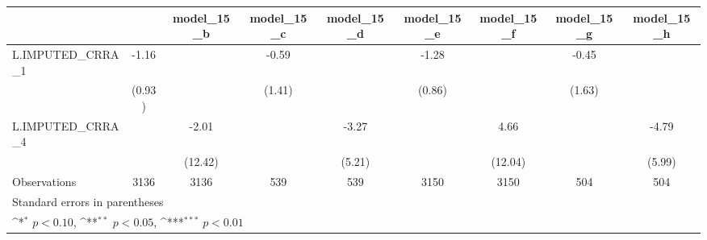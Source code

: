 {
\def\sym#1{\ifmmode^{#1}\else\(^{#1}\)\fi}
\begin{tabular}{l*{8}{c}}
\toprule
                &\multicolumn{1}{c}{}&\multicolumn{1}{c}{model\_15\_b}&\multicolumn{1}{c}{model\_15\_c}&\multicolumn{1}{c}{model\_15\_d}&\multicolumn{1}{c}{model\_15\_e}&\multicolumn{1}{c}{model\_15\_f}&\multicolumn{1}{c}{model\_15\_g}&\multicolumn{1}{c}{model\_15\_h}\\
\midrule
L.IMPUTED\_CRRA\_1&    -1.16         &                  &    -0.59         &                  &    -1.28         &                  &    -0.45         &                  \\
                &   (0.93)         &                  &   (1.41)         &                  &   (0.86)         &                  &   (1.63)         &                  \\
\addlinespace
L.IMPUTED\_CRRA\_4&                  &    -2.01         &                  &    -3.27         &                  &     4.66         &                  &    -4.79         \\
                &                  &  (12.42)         &                  &   (5.21)         &                  &  (12.04)         &                  &   (5.99)         \\
\midrule
Observations    &     3136         &     3136         &      539         &      539         &     3150         &     3150         &      504         &      504         \\
\bottomrule
\multicolumn{9}{l}{\footnotesize Standard errors in parentheses}\\
\multicolumn{9}{l}{\footnotesize \sym{*} \(p<0.10\), \sym{**} \(p<0.05\), \sym{***} \(p<0.01\)}\\
\end{tabular}
}
